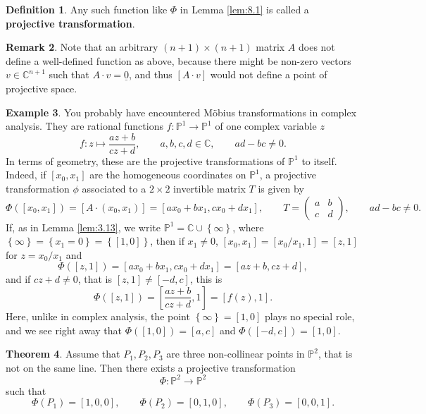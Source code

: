\documentclass{article}
\newcommand{\C}{\mathbb{C}}
\renewcommand{\P}{\mathbb{P}}
\newcommand{\rb}[1]{\left( #1 \right)}
\renewcommand{\sb}[1]{\left[ #1 \right]}
\newcommand{\cb}[1]{\left\{ #1 \right\}}
\newcommand{\two}[2]{\begin{pmatrix} #1 \\ #2 \end{pmatrix}}
\theoremstyle{definition}\newtheorem{definition}{Definition}[section]
\theoremstyle{definition}\newtheorem{notation}[definition]{Notation}
\theoremstyle{definition}\newtheorem{remark}[definition]{Remark}
\theoremstyle{definition}\newtheorem{example}[definition]{Example}
\theoremstyle{definition}\newtheorem{fact}{Fact}
\theoremstyle{definition}\newtheorem{exercise}{Exercise}
\newtheorem{theorem}[definition]{Theorem}
\begin{document}
\begin{definition}
Any such function like $ \Phi $ in Lemma \ref{lem:8.1} is called a \textbf{projective transformation}.
\end{definition}

\begin{remark}
Note that an arbitrary $ \rb{n + 1} \times \rb{n + 1} $ matrix $ A $ does not define a well-defined function as above, because there might be non-zero vectors $ v \in \C^{n + 1} $ such that $ A \cdot v = \underline{0} $, and thus $ \sb{A \cdot v} $ would not define a point of projective space.
\end{remark}

\begin{example}
You probably have encountered Möbius transformations in complex analysis. They are rational functions $ f : \P^1 \to \P^1 $ of one complex variable $ z $
$$ f : z \mapsto \dfrac{az + b}{cz + d}, \qquad a, b, c, d \in \C, \qquad ad - bc \ne 0. $$
In terms of geometry, these are the projective transformations of $ \P^1 $ to itself. Indeed, if $ \sb{x_0, x_1} $ are the homogeneous coordinates on $ \P^1 $, a projective transformation $ \phi $ associated to a $ 2 \times 2 $ invertible matrix $ T $ is given by
$$ \Phi\rb{\sb{x_0, x_1}} = \sb{A \cdot \rb{x_0, x_1}} = \sb{ax_0 + bx_1, cx_0 + dx_1}, \qquad T = \two{a & b}{c & d}, \qquad ad - bc \ne 0. $$
If, as in Lemma \ref{lem:3.13}, we write $ \P^1 = \C \cup \cb{\infty} $, where $ \cb{\infty} = \cb{x_1 = 0} = \cb{\sb{1, 0}} $, then if $ x_1 \ne 0 $, $ \sb{x_0, x_1} = \sb{x_0 / x_1, 1} = \sb{z, 1} $ for $ z = x_0 / x_1 $ and
$$ \Phi\rb{\sb{z, 1}} = \sb{ax_0 + bx_1, cx_0 + dx_1} = \sb{az + b, cz + d}, $$
and if $ cz + d \ne 0 $, that is $ \sb{z, 1} \ne \sb{-d, c} $, this is
$$ \Phi\rb{\sb{z, 1}} = \sb{\dfrac{az + b}{cz + d}, 1} = \sb{f\rb{z}, 1}. $$
Here, unlike in complex analysis, the point $ \cb{\infty} = \sb{1, 0} $ plays no special role, and we see right away that $ \Phi\rb{\sb{1, 0}} = \sb{a, c} $ and $ \Phi\rb{\sb{-d, c}} = \sb{1, 0} $.
\end{example}

\begin{theorem}
Assume that $ P_1, P_2, P_3 $ are three non-collinear points in $ \P^2 $, that is not on the same line. Then there exists a projective transformation
$$ \Phi : \P^2 \to \P^2 $$
such that
$$ \Phi\rb{P_1} = \sb{1, 0, 0}, \qquad \Phi\rb{P_2} = \sb{0, 1, 0}, \qquad \Phi\rb{P_3} = \sb{0, 0, 1}. $$
\end{theorem}
\end{document}
